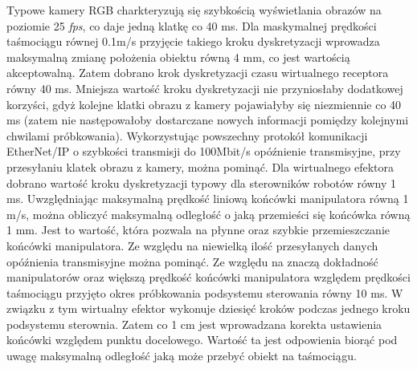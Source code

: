 \documentclass{article}
\begin{document}
Typowe kamery RGB charkteryzują się szybko\'scią wy\'swietlania obrazów na poziomie 25 \textit{fps}, co daje jedną klatkę co 40 ms. Dla maskymalnej prędko\'sci ta\'smociągu równej 0.1m/s przyjęcie takiego kroku dyskretyzacji wprowadza maksymalną zmianę położenia obiektu równą 4 mm, co jest warto\'scią akceptowalną. Zatem dobrano krok dyskretyzacji czasu wirtualnego receptora równy 40 ms. Mniejsza warto\'sć kroku dyskretyzacji nie przyniosłaby dodatkowej korzy\'sci, gdyż kolejne klatki obrazu z kamery pojawiałyby się niezmiennie co 40 ms (zatem nie następowałoby dostarczane nowych informacji pomiędzy kolejnymi chwilami próbkowania). Wykorzystując powszechny protokół komunikacji EtherNet/IP o szybko\'sci transmisji do 100Mbit/s opóźnienie transmisyjne, przy przesyłaniu klatek obrazu z kamery, można pominąć.
\newline
Dla wirtualnego efektora dobrano warto\'sć kroku dyskretyzacji typowy dla sterowników robotów równy 1 ms. Uwzględniając maksymalną prędko\'sć liniową końcówki manipulatora równą 1 m/s, można obliczyć maksymalną odległo\'sć o jaką przemie\'sci się końcówka równą 1 mm. Jest to warto\'sć, która pozwala na płynne oraz szybkie przemieszczanie końcówki manipulatora. Ze względu na niewielką ilo\'sć przesyłanych danych opóźnienia transmisyjne można pominąć.
\newline
Ze względu na znaczą dokładno\'sć manipulatorów oraz większą prędko\'sć końcówki manipulatora względem prędko\'sci ta\'smociągu przyjęto okres próbkowania podsystemu sterowania równy 10 ms. W związku z tym wirtualny efektor wykonuje dziesięć kroków podczas jednego kroku podsystemu sterownia. Zatem co 1 cm jest wprowadzana korekta ustawienia końcówki względem punktu docelowego. Warto\'sć ta jest odpowienia biorąć pod uwagę maksymalną odległo\'sć jaką może przebyć obiekt na ta\'smociągu.
\end{document}
